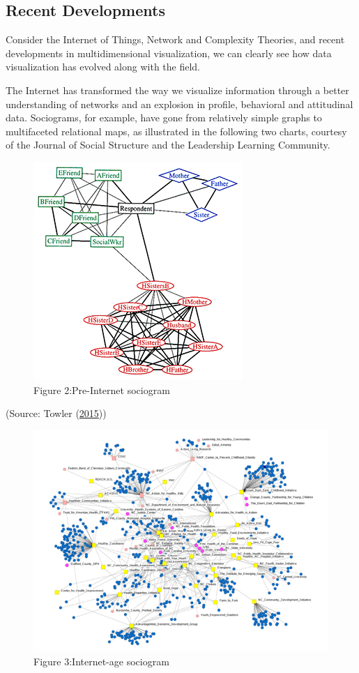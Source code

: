 \documentclass[]{book}
\begin{document}
\hypertarget{recent-developments}{%
\subsection{Recent Developments}\label{recent-developments}}

Consider the Internet of Things, Network and Complexity Theories, and recent developments in multidimensional visualization, we can clearly see how data visualization has evolved along with the field.

The Internet has transformed the way we visualize information through a better understanding of networks and an explosion in profile, behavioral and attitudinal data. Sociograms, for example, have gone from relatively simple graphs to multifaceted relational maps, as illustrated in the following two charts, courtesy of the Journal of Social Structure and the Leadership Learning Community.

\begin{figure}
\centering
\includegraphics{images/Pre-internet.jpg}
\caption{Figure 2:Pre-Internet sociogram}
\end{figure}

(Source: Towler (\protect\hyperlink{ref-future_viz}{2015}))

\begin{figure}
\centering
\includegraphics{images/InternetAge.jpg}
\caption{Figure 3:Internet-age sociogram}
\end{figure}
\end{document}
